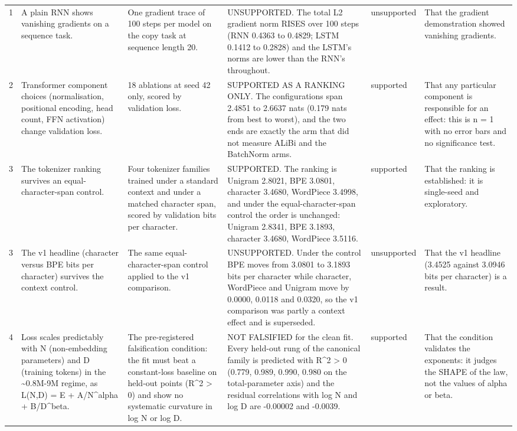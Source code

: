 {\begin{longtable}{L{0.9cm}L{2.8cm}L{2.7cm}L{3.0cm}L{1.9cm}L{2.1cm}}
1 & A plain RNN shows vanishing gradients on a sequence task. & One gradient trace of 100 steps per model on the copy task at sequence length 20. & UNSUPPORTED. The total L2 gradient norm RISES over 100 steps (RNN 0.4363 to 0.4829; LSTM 0.1412 to 0.2828) and the LSTM's norms are lower than the RNN's throughout. & unsupported & That the gradient demonstration showed vanishing gradients. \\
2 & Transformer component choices (normalisation, positional encoding, head count, FFN activation) change validation loss. & 18 ablations at seed 42 only, scored by validation loss. & SUPPORTED AS A RANKING ONLY. The configurations span 2.4851 to 2.6637 nats (0.179 nats from best to worst), and the two ends are exactly the arm that did not measure ALiBi and the BatchNorm arms. & supported & That any particular component is responsible for an effect: this is n = 1 with no error bars and no significance test. \\
3 & The tokenizer ranking survives an equal-character-span control. & Four tokenizer families trained under a standard context and under a matched character span, scored by validation bits per character. & SUPPORTED. The ranking is Unigram 2.8021, BPE 3.0801, character 3.4680, WordPiece 3.4998, and under the equal-character-span control the order is unchanged: Unigram 2.8341, BPE 3.1893, character 3.4680, WordPiece 3.5116. & supported & That the ranking is established: it is single-seed and exploratory. \\
3 & The v1 headline (character versus BPE bits per character) survives the context control. & The same equal-character-span control applied to the v1 comparison. & UNSUPPORTED. Under the control BPE moves from 3.0801 to 3.1893 bits per character while character, WordPiece and Unigram move by 0.0000, 0.0118 and 0.0320, so the v1 comparison was partly a context effect and is superseded. & unsupported & That the v1 headline (3.4525 against 3.0946 bits per character) is a result. \\
4 & Loss scales predictably with N (non-embedding parameters) and D (training tokens) in the \textasciitilde{}0.8M-9M regime, as L(N,D) = E + A/N\textasciicircum{}alpha + B/D\textasciicircum{}beta. & The pre-registered falsification condition: the fit must beat a constant-loss baseline on held-out points (R\textasciicircum{}2 > 0) and show no systematic curvature in log N or log D. & NOT FALSIFIED for the clean fit. Every held-out rung of the canonical family is predicted with R\textasciicircum{}2 > 0 (0.779, 0.989, 0.990, 0.980 on the total-parameter axis) and the residual correlations with log N and log D are -0.00002 and -0.0039. & supported & That the condition validates the exponents: it judges the SHAPE of the law, not the values of alpha or beta. \\

\end{longtable}}
